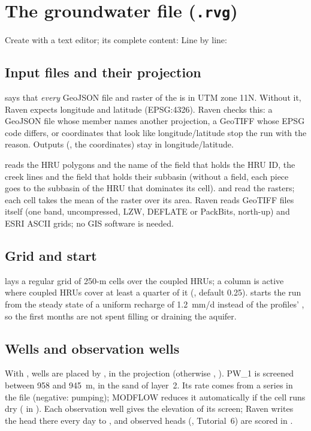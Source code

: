 \section{The groundwater file (\texttt{.rvg})}
Create  with a text editor; its complete content:
Line by line:

\subsection{Input files and their projection}
 says that \emph{every} GeoJSON file and raster of the  is in UTM zone 11N. Without it,
Raven expects longitude and latitude (EPSG:4326). Raven checks this: a GeoJSON file whose  member names another
projection, a GeoTIFF whose EPSG code differs, or coordinates that look like longitude/latitude stop the run with the
reason. Outputs (, the  coordinates) stay in longitude/latitude.

 reads the HRU polygons and the name of the field that holds the HRU ID,  the creek
lines and the field that holds their subbasin (without a field, each piece goes to the subbasin of the HRU that dominates
its cell).  and  read the rasters; each cell takes the mean of the raster over its
area. Raven reads GeoTIFF files itself (one band, uncompressed, LZW, DEFLATE or PackBits, north-up) and ESRI ASCII grids;
no GIS software is needed.

\subsection{Grid and start}
 lays a regular grid of 250-m cells over the coupled HRUs; a column is active where coupled HRUs
cover at least a quarter of it (, default 0.25).  starts the
run from the steady state of a uniform recharge of 1.2~mm/d instead of the profiles' , so the
first months are not spent filling or draining the aquifer.

\subsection{Wells and observation wells}
With , wells are placed by ,  in the projection (otherwise , ).
PW\_1 is screened between 958 and 945~m, in the sand of layer~2. Its rate comes from a  series in the
 file (negative: pumping); MODFLOW reduces it automatically if the cell runs dry ( in
). Each observation well gives the elevation of its screen; Raven writes the head there every day to
, and observed heads (, Tutorial~6) are scored in .

